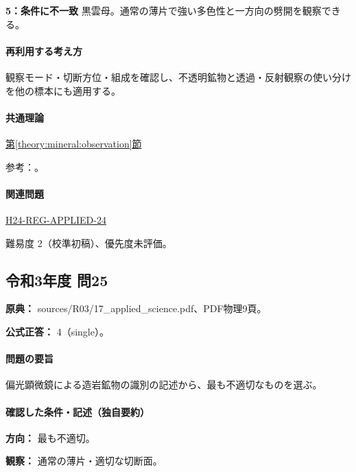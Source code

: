 \noindent\textbf{5：条件に不一致} 黒雲母。通常の薄片で強い多色性と一方向の劈開を観察できる。\par

\paragraph{再利用する考え方} 観察モード・切断方位・組成を確認し、不透明鉱物と透過・反射観察の使い分けを他の標本にも適用する。

\paragraph{共通理論} \hyperref[theory:mineral:observation]{第\ref*{theory:mineral:observation}節}

\par 参考：\cite{hom_pyrite}。

\paragraph{関連問題} \hyperref[q:h24-reg-applied-24]{H24-REG-APPLIED-24}

\par 難易度 2（校準初稿）、優先度未評価。

\subsection{令和3年度 問25}
\label{q:r03-reg-applied-25}

\noindent\textbf{原典：} sources/R03/17\_applied\_science.pdf、PDF物理9頁。

\textbf{公式正答：} 4（single）。

\paragraph{問題の要旨} 偏光顕微鏡による造岩鉱物の識別の記述から、最も不適切なものを選ぶ。

\paragraph{確認した条件・記述（独自要約）}\mbox{}\par

\noindent\textbf{方向：} 最も不適切。\par

\noindent\textbf{観察：} 通常の薄片・適切な切断面。\par

